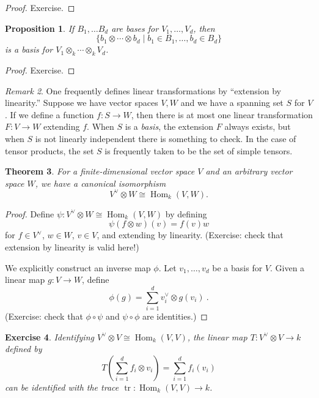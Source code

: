 \documentclass[12pt]{article}
\theoremstyle{plain}
\newtheorem{theorem}{Theorem}[section]
\newtheorem{proposition}[theorem]{Proposition}
\newtheorem{exercise}[theorem]{Exercise}
\theoremstyle{definition}
\theoremstyle{remark}
\newtheorem{remark}[theorem]{Remark}
\numberwithin{equation}{section}
\begin{document}
\begin{proof}
Exercise.
\end{proof}

\begin{proposition}
If $B_1,\ldots B_d$ are bases for $V_1,\ldots,V_d$, then
\[
\{ b_1 \otimes \cdots \otimes b_d \mid b_1 \in B_1, \ldots, b_d \in B_d
\}
\]
is a basis for $V_1 \otimes_k \cdots \otimes_k V_d$.
\end{proposition}

\begin{proof}
Exercise.
\end{proof}

\begin{remark}
One frequently defines linear transformations by
``extension by linearity.''
Suppose we have vector spaces $V,W$ and we have a spanning
set $S$ for $V$.  If we define a function $f : S \to W$,
then there is at most one linear transformation $F : V \to W$
extending $f$.  When $S$ is a \emph{basis}, the extension $F$ always exists,
but when $S$ is not linearly independent there is something to check.
In the case of tensor products, the set $S$ is frequently taken to be
the set of simple tensors.
\end{remark}

\begin{theorem}
For a finite-dimensional vector space $V$ and an arbitrary vector space
$W$, we have a canonical isomorphism
\[
V^\vee \otimes W \cong \operatorname{Hom}_k(V,W) .
\]
\end{theorem}

\begin{proof}
Define $\psi : V^\vee \otimes W \cong \operatorname{Hom}_k(V,W)$
by defining
\[
\psi(f \otimes w)(v) = f(v)w
\]
for $f \in V^\vee$, $w \in W$, $v \in V$, and extending by linearity.
(Exercise: check that extension by linearity is valid here!)

We explicitly construct an inverse map $\phi$.
Let $v_1,\ldots, v_d$ be a basis for $V$.
Given a linear map $g : V \to W$, define
\[
\phi(g) = \sum_{i=1}^d v^\vee_i \otimes g(v_i) \ .
\]
(Exercise: check that $\phi \circ \psi$ and $\psi \circ \phi$ are
identities.)
\end{proof}

\begin{exercise}
Identifying $V^\vee \otimes V \cong \operatorname{Hom}_k(V,V)$,
the linear map $T: V^\vee \otimes V \to k$ defined by
\[
T\left( \sum_{i=1}^d f_i \otimes v_i\right)
= \sum_{i=1}^d f_i(v_i)
\]
can be identified with the trace $\operatorname{tr} :
\operatorname{Hom}_k(V,V) \to k$.
\end{exercise}
\end{document}
